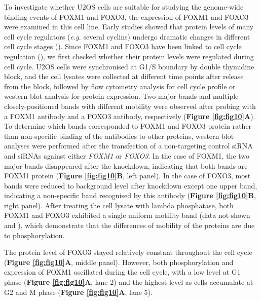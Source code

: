 To investigate whether U2OS cells are suitable for studying the genome-wide binding events of FOXM1 and FOXO3, the expression of FOXM1 and FOXO3 were examined in this cell line. Early studies showed that protein levels of many cell cycle regulators (\textit{e.g.} several cyclins) undergo dramatic changes in different cell cycle stages (\cite{hochegger2008cyclin-dependent}). Since FOXM1 and FOXO3 have been linked to cell cycle regulation (\cite{alvarez2001forkhead,laoukili2005foxm1}), we first checked whether their protein levels were regulated during cell cycle. U2OS cells were synchronised at G1/S boundary by double thymidine block, and the cell lysates were collected at different time points after release from the block, followed by flow cytometry analysis for cell cycle profile or western blot analysis for protein expression. Two major bands and multiple closely-positioned bands with different mobility were observed after probing with a FOXM1 antibody and a FOXO3 antibody, respectively (\textbf{Figure \ref{fig:fig10}A}). To determine which bands corresponded to FOXM1 and FOXO3 protein rather than non-specific binding of the antibodies to other proteins, western blot analyses were performed after the transfection of a non-targeting control siRNA and siRNAs against either \textit{FOXM1} or \textit{FOXO3}. In the case of FOXM1, the two major bands disappeared after the knockdown, indicating that both bands are FOXM1 protein (\textbf{Figure \ref{fig:fig10}B}, left panel). In the case of FOXO3, most bands were reduced to background level after knockdown except one upper band, indicating a non-specific band recognised by this antibody (\textbf{Figure \ref{fig:fig10}B}, right panel). After treating the cell lysate with lambda phosphatase, both FOXM1 and FOXO3 exhibited a single uniform motility band (data not shown and \cite{park2008anaphase-promoting}), which demonstrate that the differences of mobility of the proteins are due to phosphorylation.

The protein level of FOXO3 stayed relatively constant throughout the cell cycle (\textbf{Figure \ref{fig:fig10}A}, middle panel). However, both phosphorylation and expression of FOXM1 oscillated during the cell cycle, with a low level at G1 phase (\textbf{Figure \ref{fig:fig10}A}, lane 2) and the highest level as cells accumulate at G2 and M phase (\textbf{Figure \ref{fig:fig10}A}, lane 5).

